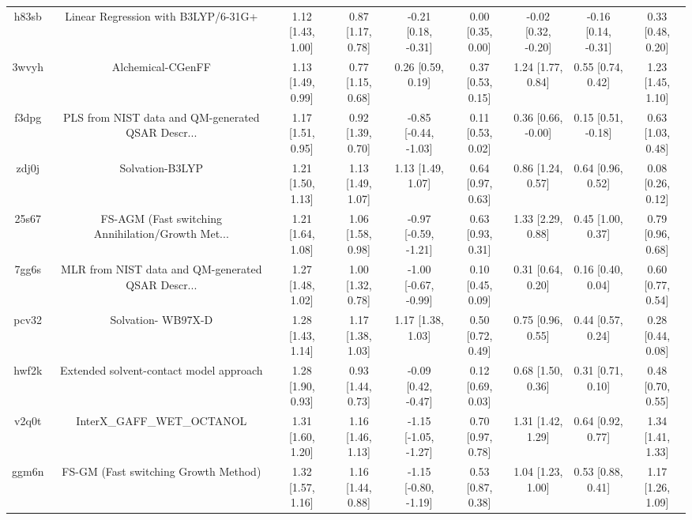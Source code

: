 \documentclass{article}
\begin{document}
\begin{center}
\begin{longtable}{|ccccccccc|}
 h83sb &                Linear Regression with B3LYP/6-31G+ &  1.12 [1.43, 1.00] &  0.87 [1.17, 0.78] &   -0.21 [0.18, -0.31] &  0.00 [0.35, 0.00] &   -0.02 [0.32, -0.20] &   -0.16 [0.14, -0.31] &     0.33 [0.48, 0.20] \\
 3wvyh &                                  Alchemical-CGenFF &  1.13 [1.49, 0.99] &  0.77 [1.15, 0.68] &     0.26 [0.59, 0.19] &  0.37 [0.53, 0.15] &     1.24 [1.77, 0.84] &     0.55 [0.74, 0.42] &     1.23 [1.45, 1.10] \\
 f3dpg &  PLS from NIST data and QM-generated QSAR Descr... &  1.17 [1.51, 0.95] &  0.92 [1.39, 0.70] &  -0.85 [-0.44, -1.03] &  0.11 [0.53, 0.02] &    0.36 [0.66, -0.00] &    0.15 [0.51, -0.18] &     0.63 [1.03, 0.48] \\
 zdj0j &                                    Solvation-B3LYP &  1.21 [1.50, 1.13] &  1.13 [1.49, 1.07] &     1.13 [1.49, 1.07] &  0.64 [0.97, 0.63] &     0.86 [1.24, 0.57] &     0.64 [0.96, 0.52] &     0.08 [0.26, 0.12] \\
 25s67 &  FS-AGM (Fast switching Annihilation/Growth Met... &  1.21 [1.64, 1.08] &  1.06 [1.58, 0.98] &  -0.97 [-0.59, -1.21] &  0.63 [0.93, 0.31] &     1.33 [2.29, 0.88] &     0.45 [1.00, 0.37] &     0.79 [0.96, 0.68] \\
 7gg6s &  MLR from NIST data and QM-generated QSAR Descr... &  1.27 [1.48, 1.02] &  1.00 [1.32, 0.78] &  -1.00 [-0.67, -0.99] &  0.10 [0.45, 0.09] &     0.31 [0.64, 0.20] &     0.16 [0.40, 0.04] &     0.60 [0.77, 0.54] \\
 pcv32 &                                 Solvation- WB97X-D &  1.28 [1.43, 1.14] &  1.17 [1.38, 1.03] &     1.17 [1.38, 1.03] &  0.50 [0.72, 0.49] &     0.75 [0.96, 0.55] &     0.44 [0.57, 0.24] &     0.28 [0.44, 0.08] \\
 hwf2k &            Extended solvent-contact model approach &  1.28 [1.90, 0.93] &  0.93 [1.44, 0.73] &   -0.09 [0.42, -0.47] &  0.12 [0.69, 0.03] &     0.68 [1.50, 0.36] &     0.31 [0.71, 0.10] &     0.48 [0.70, 0.55] \\
 v2q0t &                         InterX\_GAFF\_WET\_OCTANOL &  1.31 [1.60, 1.20] &  1.16 [1.46, 1.13] &  -1.15 [-1.05, -1.27] &  0.70 [0.97, 0.78] &     1.31 [1.42, 1.29] &     0.64 [0.92, 0.77] &     1.34 [1.41, 1.33] \\
 ggm6n &               FS-GM (Fast switching Growth Method) &  1.32 [1.57, 1.16] &  1.16 [1.44, 0.88] &  -1.15 [-0.80, -1.19] &  0.53 [0.87, 0.38] &     1.04 [1.23, 1.00] &     0.53 [0.88, 0.41] &     1.17 [1.26, 1.09] \\

\end{longtable}
\end{center}
\end{document}

